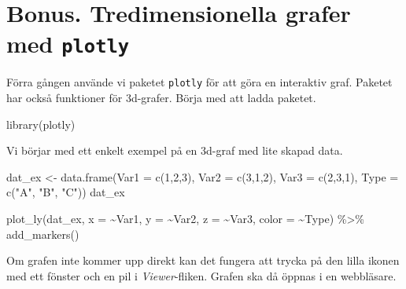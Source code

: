 \documentclass[
]{book}
\newenvironment{Shaded}{\begin{snugshade}}{\end{snugshade}}
\newcommand{\AttributeTok}[1]{\textcolor[rgb]{0.77,0.63,0.00}{#1}}
\newcommand{\DecValTok}[1]{\textcolor[rgb]{0.00,0.00,0.81}{#1}}
\newcommand{\FunctionTok}[1]{\textcolor[rgb]{0.00,0.00,0.00}{#1}}
\newcommand{\NormalTok}[1]{#1}
\newcommand{\OtherTok}[1]{\textcolor[rgb]{0.56,0.35,0.01}{#1}}
\newcommand{\SpecialCharTok}[1]{\textcolor[rgb]{0.00,0.00,0.00}{#1}}
\newcommand{\StringTok}[1]{\textcolor[rgb]{0.31,0.60,0.02}{#1}}
\theoremstyle{definition}
\theoremstyle{definition}
\theoremstyle{definition}
\theoremstyle{definition}
\theoremstyle{remark}
\begin{document}
\hypertarget{bonus.-tredimensionella-grafer-med-plotly}{%
\section{\texorpdfstring{Bonus. Tredimensionella grafer med \texttt{plotly}}{Bonus. Tredimensionella grafer med plotly}}\label{bonus.-tredimensionella-grafer-med-plotly}}

Förra gången använde vi paketet \texttt{plotly} för att göra en interaktiv graf. Paketet har också funktioner för 3d-grafer. Börja med att ladda paketet.

\begin{Shaded}
\begin{Highlighting}[]
\FunctionTok{library}\NormalTok{(plotly)}
\end{Highlighting}
\end{Shaded}

Vi börjar med ett enkelt exempel på en 3d-graf med lite skapad data.

\begin{Shaded}
\begin{Highlighting}[]
\NormalTok{dat\_ex }\OtherTok{\textless{}{-}} \FunctionTok{data.frame}\NormalTok{(}\AttributeTok{Var1 =} \FunctionTok{c}\NormalTok{(}\DecValTok{1}\NormalTok{,}\DecValTok{2}\NormalTok{,}\DecValTok{3}\NormalTok{), }\AttributeTok{Var2 =} \FunctionTok{c}\NormalTok{(}\DecValTok{3}\NormalTok{,}\DecValTok{1}\NormalTok{,}\DecValTok{2}\NormalTok{), }\AttributeTok{Var3 =} \FunctionTok{c}\NormalTok{(}\DecValTok{2}\NormalTok{,}\DecValTok{3}\NormalTok{,}\DecValTok{1}\NormalTok{), }\AttributeTok{Type =} \FunctionTok{c}\NormalTok{(}\StringTok{"A"}\NormalTok{, }\StringTok{"B"}\NormalTok{, }\StringTok{"C"}\NormalTok{))}
\NormalTok{dat\_ex}

\FunctionTok{plot\_ly}\NormalTok{(dat\_ex, }\AttributeTok{x =} \SpecialCharTok{\textasciitilde{}}\NormalTok{Var1, }\AttributeTok{y =} \SpecialCharTok{\textasciitilde{}}\NormalTok{Var2, }\AttributeTok{z =} \SpecialCharTok{\textasciitilde{}}\NormalTok{Var3, }\AttributeTok{color =} \SpecialCharTok{\textasciitilde{}}\NormalTok{Type) }\SpecialCharTok{\%\textgreater{}\%} 
  \FunctionTok{add\_markers}\NormalTok{()}
\end{Highlighting}
\end{Shaded}

Om grafen inte kommer upp direkt kan det fungera att trycka på den lilla ikonen med ett fönster och en pil i \emph{Viewer}-fliken. Grafen ska då öppnas i en webbläsare.
\end{document}
